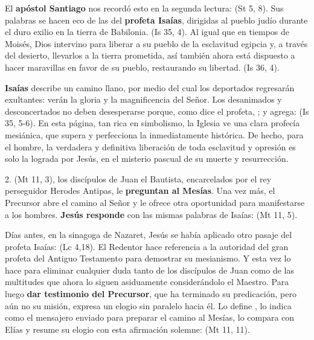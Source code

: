 El \textbf{apóstol Santiago} nos recordó esto en la segunda lectura:  (St 5, 8). Sus palabras se hacen eco de las del \textbf{profeta Isaías}, dirigidas al pueblo judío durante el duro exilio en la tierra de Babilonia.  (Is 35, 4). Al igual que en tiempos de Moisés, Dios intervino para liberar a su pueblo de la esclavitud egipcia y, a través del desierto, llevarlos a la tierra prometida, así también ahora está dispuesto a hacer maravillas en favor de su pueblo, restaurando su libertad.  (Is 36, 4).

\textbf{Isaías} describe un camino llano, por medio del cual los deportados regresarán exultantes: verán la gloria y la magnificencia del Señor. Los desanimados y desconcertados no deben desesperarse porque, como dice el profeta, ; y agrega:  (Is 35, 5-6). En esta página, tan rica en simbolismo, la Iglesia ve una clara profecía mesiánica, que supera y perfecciona la inmediatamente histórica. De hecho, para el hombre, la verdadera y definitiva liberación de toda esclavitud y opresión es solo la lograda por Jesús, en el misterio pascual de su muerte y resurrección.

2.  (Mt 11, 3), los discípulos de Juan el Bautista, encarcelados por el rey perseguidor Herodes Antipas, le \textbf{preguntan al Mesías}.  Una vez más, el Precursor abre el camino al Señor y le ofrece otra oportunidad para manifestarse a los hombres. \textbf{Jesús responde} con las mismas palabras de Isaías:  (Mt 11, 5).

Días antes, en la sinagoga de Nazaret, Jesús se había aplicado otro pasaje del profeta Isaías:  (Lc 4,18). El Redentor hace referencia a la autoridad del gran profeta del Antiguo Testamento para demostrar su mesianismo. Y esta vez lo hace para eliminar cualquier duda tanto de los discípulos de Juan como de las multitudes que ahora lo siguen asiduamente considerándolo el Maestro. Para luego \textbf{dar testimonio del Precursor}, que ha terminado su predicación, pero aún no su misión, expresa un elogio sin paralelo hacia él. Lo define , lo indica como el mensajero enviado para preparar el camino al Mesías, lo compara con Elías y resume su elogio con esta afirmación solemne:  (Mt 11, 11).

